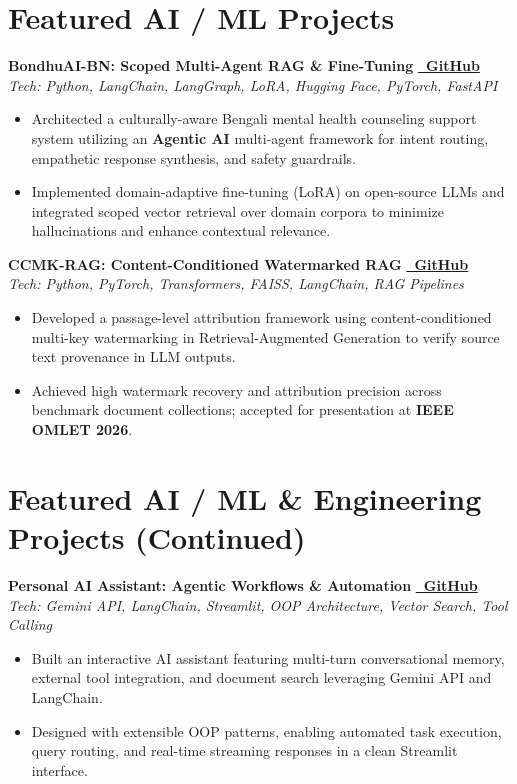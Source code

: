 \documentclass[a4paper,10pt]{article}
\newcommand{\projectEntry}[4]{
  \vspace{3pt}
  \noindent\textbf{\color{primary}#1} \hfill \href{#3}{\color{primary}\textbf{\faGithub~GitHub}} \\
  \noindent\textit{\footnotesize #2}
  \begin{itemize}[leftmargin=12pt, topsep=1pt, itemsep=1.5pt]
    #4
  \end{itemize}
}
\begin{document}
\section{Featured AI / ML Projects}

\projectEntry
  {BondhuAI-BN: Scoped Multi-Agent RAG \& Fine-Tuning}
  {Tech: Python, LangChain, LangGraph, LoRA, Hugging Face, PyTorch, FastAPI}
  {https://github.com/ashraf1600}
  {
    \item Architected a culturally-aware Bengali mental health counseling support system utilizing an \textbf{Agentic AI} multi-agent framework for intent routing, empathetic response synthesis, and safety guardrails.
    \item Implemented domain-adaptive fine-tuning (LoRA) on open-source LLMs and integrated scoped vector retrieval over domain corpora to minimize hallucinations and enhance contextual relevance.
  }

\projectEntry
  {CCMK-RAG: Content-Conditioned Watermarked RAG}
  {Tech: Python, PyTorch, Transformers, FAISS, LangChain, RAG Pipelines}
  {https://github.com/ashraf1600}
  {
    \item Developed a passage-level attribution framework using content-conditioned multi-key watermarking in Retrieval-Augmented Generation to verify source text provenance in LLM outputs.
    \item Achieved high watermark recovery and attribution precision across benchmark document collections; accepted for presentation at \textbf{IEEE OMLET 2026}.
  }

\newpage

\section{Featured AI / ML \& Engineering Projects (Continued)}

\projectEntry
  {Personal AI Assistant: Agentic Workflows \& Automation}
  {Tech: Gemini API, LangChain, Streamlit, OOP Architecture, Vector Search, Tool Calling}
  {https://github.com/ashraf1600/Personal-AI-Assistant-Gemini-API-OOP-Streamlit-/tree/main}
  {
    \item Built an interactive AI assistant featuring multi-turn conversational memory, external tool integration, and document search leveraging Gemini API and LangChain.
    \item Designed with extensible OOP patterns, enabling automated task execution, query routing, and real-time streaming responses in a clean Streamlit interface.
  }
\end{document}
